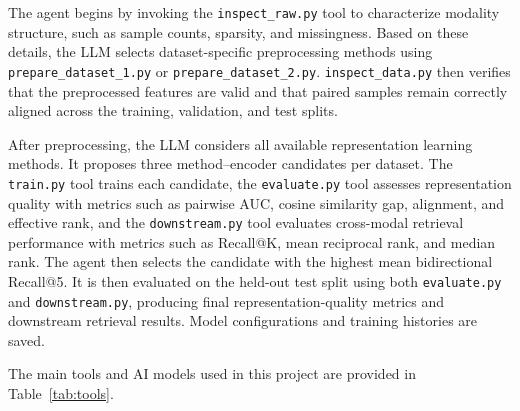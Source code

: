 \documentclass[10pt]{article}
\begin{document}
The agent begins by invoking the \texttt{inspect\_raw.py} tool to characterize modality structure, 
such as sample counts, sparsity, and missingness. Based on these details, the LLM selects dataset-specific 
preprocessing methods using \texttt{prepare\_dataset\_1.py} or \texttt{prepare\_dataset\_2.py}. 
\texttt{inspect\_data.py} then verifies that the preprocessed features are valid and that paired samples remain correctly
aligned across the training, validation, and test splits. 

After preprocessing, the LLM considers all available representation learning methods. 
It proposes three method--encoder candidates per dataset. 
The \texttt{train.py} tool trains each candidate, the \texttt{evaluate.py} tool assesses representation quality 
with metrics such as pairwise AUC, cosine similarity gap, alignment, and effective rank,
and the \texttt{downstream.py} tool evaluates cross-modal retrieval performance 
with metrics such as Recall@K, mean reciprocal rank, and median rank. 
The agent then selects the candidate with the highest mean 
bidirectional Recall@5. It is then evaluated on the held-out test split 
using both \texttt{evaluate.py} 
and \texttt{downstream.py}, producing final representation-quality metrics 
and downstream retrieval results. Model configurations and training histories are saved.

The main tools and AI models used in this project are provided
in Table~\ref{tab:tools}.
\end{document}

